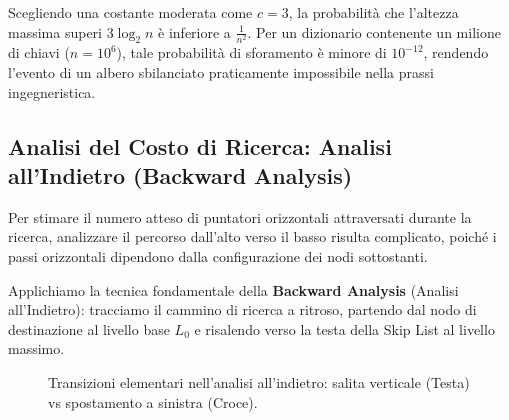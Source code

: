 \begin{example}
Scegliendo una costante moderata come $c = 3$, la probabilità che l'altezza massima superi $3 \log_2 n$ è inferiore a $\frac{1}{n^2}$. Per un dizionario contenente un milione di chiavi ($n = 10^6$), tale probabilità di sforamento è minore di $10^{-12}$, rendendo l'evento di un albero sbilanciato praticamente impossibile nella prassi ingegneristica.
\end{example}

\FloatBarrier
\subsection{Analisi del Costo di Ricerca: Analisi all'Indietro (Backward Analysis)}
Per stimare il numero atteso di puntatori orizzontali attraversati durante la ricerca, analizzare il percorso dall'alto verso il basso risulta complicato, poiché i passi orizzontali dipendono dalla configurazione dei nodi sottostanti.

Applichiamo la tecnica fondamentale della \textbf{Backward Analysis} (Analisi all'Indietro): tracciamo il cammino di ricerca a ritroso, partendo dal nodo di destinazione al livello base $L_0$ e risalendo verso la testa della Skip List al livello massimo.

\begin{figure}[H]
\centering
{}
\caption{Transizioni elementari nell'analisi all'indietro: salita verticale (Testa) vs spostamento a sinistra (Croce).}
\label{fig:backward-analysis-transitions}
\end{figure}

